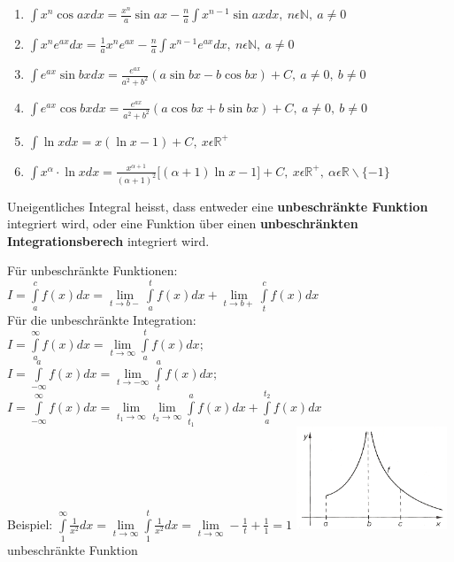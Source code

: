 \begin{enumerate}
    \item $ \int x^n\cos axdx=\frac{x^n}{a}\sin ax-\frac{n}{a}\int x^{n-1}\sin axdx,\ n\epsilon\mathbb N,\ a\neq0 $
    \item $ \int x^ne^{ax}dx=\frac{1}{a}x^ne^{ax}-\frac{n}{a}\int
    x^{n-1}e^{ax}dx,\ n\epsilon\mathbb N,\ a\neq0 $
    \item $ \int e^{ax}\sin bxdx=\frac{e^{ax}}{a^2+b^2}(a\sin bx-b\cos bx)+C,\
    a\neq0,\ b\neq0 $
    \item $ \int e^{ax}\cos bxdx=\frac{e^{ax}}{a^2+b^2}(a\cos bx + b\sin bx)+C,\
    a\neq0,\ b\neq0 $
    \item $ \int\ln x dx = x(\ln x-1)+C,\ x\epsilon\mathbb R^+ $
    \item $ \int x^\alpha \cdot \ln xdx =
    \frac{x^{\alpha+1}}{(\alpha+1)^2}\lbrack(\alpha+1)\ln x-1\rbrack + C,\
    x\epsilon\mathbb R^+,\ \alpha\epsilon\mathbb R\backslash\{-1\} $
  \end{enumerate}

  Uneigentliches Integral heisst, dass entweder eine \textbf{unbeschr\"ankte
  Funktion} integriert wird, oder eine Funktion \"uber einen
  \textbf{unbeschr\"ankten Integrationsberech} integriert wird.\\


  \begin{multicols}{2}
    F\"ur unbeschr\"ankte Funktionen:\\
    $ I =\int\limits _{a}^{c}f(x)dx=\lim\limits_{t\to
    b-}\int\limits_{a}^{t}f(x)dx+\lim\limits_{t\to b+}\int\limits_{t}^{c}f(x)dx
    $ \\
    F\"ur die unbeschr\"ankte Integration:\\
    $ I =\int\limits _{a} ^{\infty} f(x)dx= \lim \limits_{t\to \infty}\int \limits
    _{a} ^{t}f(x)dx; $ \\
    $ I =\int\limits ^{a} _{-\infty} f(x)dx= \lim \limits_{t\to -\infty}\int
    \limits _{t} ^{a}f(x)dx; $ \\
    $I =\int\limits _{-\infty} ^{\infty} f(x)dx = \lim \limits_{t_1\to \infty} \lim
    \limits
    _{t_2 \to  \infty}\int \limits _{t_1} ^{a}f(x)dx +
    \int\limits_{a}^{t_2}f(x)dx$\\
    Beispiel: $\int\limits_{1}^{\infty}\frac{1}{x^2}dx=\lim\limits_{t\to
    \infty}\int\limits_{1}^{t}\frac{1}{x^2}dx=\lim\limits_{t\to \infty}-\frac{1}{t}+\frac{1}{1}=1$
    \includegraphics[width=4.5cm]{./bilder/unbeschraenkteFunktion.png}\\
    unbeschr\"ankte Funktion
  \end{multicols}
  

